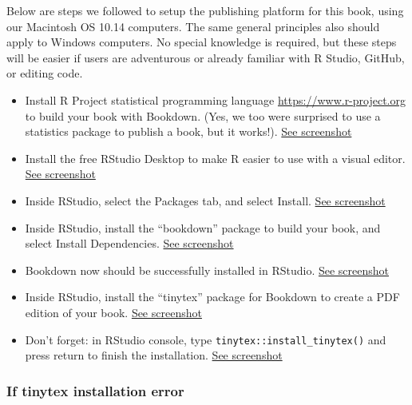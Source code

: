 \documentclass[
  english,
]{book}
\providecommand{\tightlist}{%
  \setlength{\itemsep}{0pt}\setlength{\parskip}{0pt}}
\begin{document}
Below are steps we followed to setup the publishing platform for this book, using our Macintosh OS 10.14 computers. The same general principles also should apply to Windows computers. No special knowledge is required, but these steps will be easier if users are adventurous or already familiar with R Studio, GitHub, or editing code.

\begin{itemize}
\tightlist
\item
  Install R Project statistical programming language \url{https://www.r-project.org} to build your book with Bookdown. (Yes, we too were surprised to use a statistics package to publish a book, but it works!). \href{images/15-bookdown/1-r-download.png}{See screenshot}
\item
  Install the free RStudio Desktop to make R easier to use with a visual editor. \href{images/15-bookdown/2-download-rstudio.png}{See screenshot}
\item
  Inside RStudio, select the Packages tab, and select Install. \href{images/15-bookdown/3-packages-install.png}{See screenshot}
\item
  Inside RStudio, install the ``bookdown'' package to build your book, and select Install Dependencies. \href{images/15-bookdown/4-install-bookdown.png}{See screenshot}
\item
  Bookdown now should be successfully installed in RStudio. \href{images/15-bookdown/5-installed.png}{See screenshot}
\item
  Inside RStudio, install the ``tinytex'' package for Bookdown to create a PDF edition of your book. \href{images/15-bookdown/6-install-tinytex.png}{See screenshot}
\item
  Don't forget: in RStudio console, type \texttt{tinytex::install\_tinytex()} and press return to finish the installation. \href{images/15-bookdown/7-finish-install-tinytex.png}{See screenshot}
\end{itemize}

\hypertarget{if-tinytex-installation-error}{%
\subsubsection*{If tinytex installation error}\label{if-tinytex-installation-error}}
\end{document}
